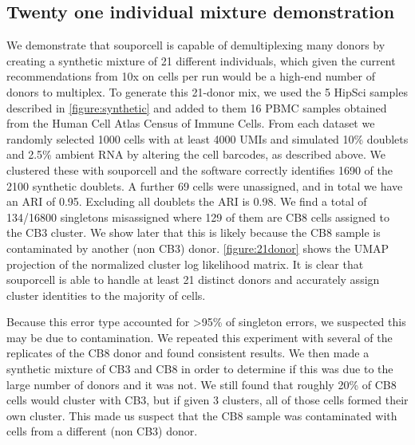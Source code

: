 \subsection{Twenty one individual mixture demonstration}
\par{
We demonstrate that souporcell is capable of demultiplexing many donors by creating a synthetic mixture
of 21 different individuals, which given the current recommendations from 10x on cells per run would be
a high-end number of donors to multiplex. To generate this 21-donor mix, we used the 5 HipSci samples
described in \ref{figure:synthetic} and added to them 16 PBMC samples obtained from the Human Cell Atlas Census of
Immune Cells. From each dataset we randomly selected 1000 cells with at least 4000 UMIs and
simulated 10\% doublets and 2.5\% ambient RNA by altering the cell barcodes, as described above. We
clustered these with souporcell and the software correctly identifies 1690 of the 2100 synthetic doublets.
A further 69 cells were unassigned, and in total we have an ARI of 0.95. Excluding all doublets the ARI
is 0.98. We find a total of 134/16800 singletons misassigned where 129 of them are CB8 cells assigned to
the CB3 cluster. We show later that this is likely because the CB8 sample is contaminated by another
(non CB3) donor. \ref{figure:21donor} shows the UMAP projection of the normalized cluster log likelihood
matrix. It is clear that souporcell is able to handle at least 21 distinct donors and accurately assign cluster
identities to the majority of cells. 
} \\

\par{
Because this error type accounted for >95\% of singleton errors, we suspected this may be due to
contamination. We repeated this experiment with several of the replicates of the CB8 donor and found
consistent results. We then made a synthetic mixture of CB3 and CB8 in order to determine if this was
due to the large number of donors and it was not. We still found that roughly 20\% of CB8 cells would
cluster with CB3, but if given 3 clusters, all of those cells formed their own cluster. This made us suspect 
that the CB8 sample was contaminated with cells from a different (non CB3) donor.
}


